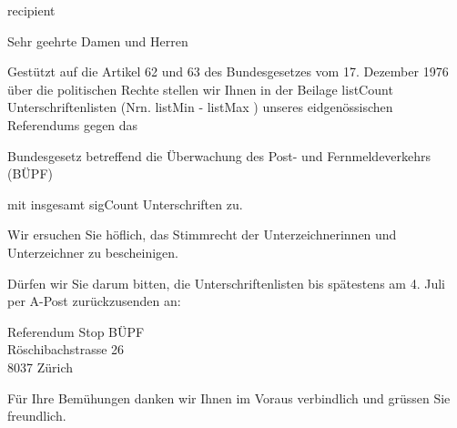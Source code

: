 \documentclass[a4paper,10pt,parskip=half]{scrlttr2}
\begin{document}
\begin{letter}{ {{ recipient }} }





\opening{Sehr geehrte Damen und Herren }

Gestützt auf die Artikel 62 und 63 des Bundesgesetzes vom 17. Dezember 1976 über die politischen Rechte stellen wir Ihnen in der Beilage {{ listCount }} Unterschriftenlisten (Nrn. {{ listMin }} - {{ listMax }}) unseres eidgenössischen Referendums gegen das

\leftskip=3mm
Bundesgesetz betreffend die Überwachung des Post- und Fernmeldeverkehrs (BÜPF)

\leftskip=0mm
mit insgesamt {{ sigCount }} Unterschriften zu.

Wir ersuchen Sie höflich, das Stimmrecht der Unterzeichnerinnen und Unterzeichner zu bescheinigen.

Dürfen wir Sie darum bitten, die Unterschriftenlisten bis spätestens am 4. Juli per A-Post zurückzusenden an:

\leftskip=3mm
Referendum Stop BÜPF \\
Röschibachstrasse 26 \\
8037 Zürich

\leftskip=0mm
\closing{Für Ihre Bemühungen danken wir Ihnen im Voraus verbindlich und grüssen Sie freundlich.}

\end{letter}
\end{document}
